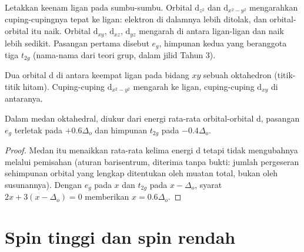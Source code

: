Letakkan keenam ligan pada sumbu-sumbu. Orbital $\mathrm d_{z^2}$ dan $\mathrm d_{x^2-y^2}$
mengarahkan cuping-cupingnya tepat ke ligan: elektron di dalamnya lebih
ditolak, dan orbital-orbital itu naik. Orbital $\mathrm d_{xy}$, $\mathrm d_{xz}$, $\mathrm d_{yz}$
mengarah di antara ligan-ligan dan naik lebih sedikit. Pasangan pertama
disebut $e_g$, himpunan kedua yang beranggota tiga
$t_{2g}$ (nama-nama dari teori grup, dalam jilid Tahun 3).

\begin{omfigure}

{\small Dua orbital d di antara keempat ligan pada bidang $xy$ sebuah
oktahedron (titik-titik hitam). Cuping-cuping $\mathrm d_{x^2-y^2}$ mengarah ke
ligan, cuping-cuping $\mathrm d_{xy}$ di antaranya.}
\end{omfigure}

\begin{theorem}[Barisentrum]\label{thm:b2:ligand-field:barycentre}
Dalam medan oktahedral, diukur dari energi rata-rata orbital-orbital d,
pasangan $e_g$ terletak pada $+0.6\Delta_o$ dan himpunan $t_{2g}$ pada $-0.4\Delta_o$.
\end{theorem}

\begin{proof}
Medan itu menaikkan rata-rata kelima energi d tetapi tidak mengubahnya
melalui pemisahan (aturan barisentrum, diterima tanpa bukti: jumlah
pergeseran sehimpunan orbital yang lengkap ditentukan oleh muatan total,
bukan oleh susunannya). Dengan $e_g$ pada $x$ dan
$t_{2g}$ pada $x - \Delta_o$, syarat $2x + 3(x - \Delta_o) = 0$ memberikan $x = 0.6\Delta_o$.
\end{proof}

\section{Spin tinggi dan spin rendah}


